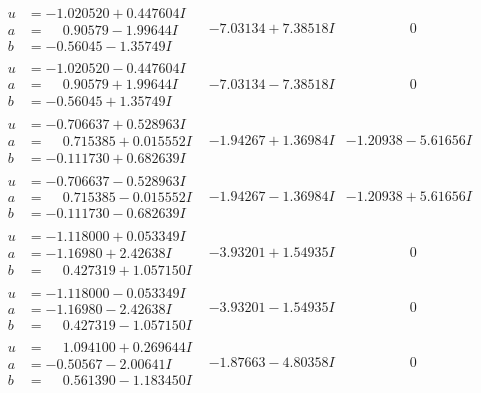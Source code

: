 \documentclass[1p]{elsarticle_modified}
\theoremstyle{definition}
\begin{document}
$$\begin{array}{c|c|c}
\begin{aligned}
u &= -1.020520 + 0.447604 I \\
a &= \phantom{-}0.90579 - 1.99644 I \\
b &= -0.56045 - 1.35749 I\end{aligned}
 & -7.03134 + 7.38518 I & \phantom{-0.000000 } 0 \\ \hline\begin{aligned}
u &= -1.020520 - 0.447604 I \\
a &= \phantom{-}0.90579 + 1.99644 I \\
b &= -0.56045 + 1.35749 I\end{aligned}
 & -7.03134 - 7.38518 I & \phantom{-0.000000 } 0 \\ \hline\begin{aligned}
u &= -0.706637 + 0.528963 I \\
a &= \phantom{-}0.715385 + 0.015552 I \\
b &= -0.111730 + 0.682639 I\end{aligned}
 & -1.94267 + 1.36984 I & -1.20938 - 5.61656 I \\ \hline\begin{aligned}
u &= -0.706637 - 0.528963 I \\
a &= \phantom{-}0.715385 - 0.015552 I \\
b &= -0.111730 - 0.682639 I\end{aligned}
 & -1.94267 - 1.36984 I & -1.20938 + 5.61656 I \\ \hline\begin{aligned}
u &= -1.118000 + 0.053349 I \\
a &= -1.16980 + 2.42638 I \\
b &= \phantom{-}0.427319 + 1.057150 I\end{aligned}
 & -3.93201 + 1.54935 I & \phantom{-0.000000 } 0 \\ \hline\begin{aligned}
u &= -1.118000 - 0.053349 I \\
a &= -1.16980 - 2.42638 I \\
b &= \phantom{-}0.427319 - 1.057150 I\end{aligned}
 & -3.93201 - 1.54935 I & \phantom{-0.000000 } 0 \\ \hline\begin{aligned}
u &= \phantom{-}1.094100 + 0.269644 I \\
a &= -0.50567 - 2.00641 I \\
b &= \phantom{-}0.561390 - 1.183450 I\end{aligned}
 & -1.87663 - 4.80358 I & \phantom{-0.000000 } 0 \\ \hline\begin{aligned}

\end{aligned}
\end{array}$$
\end{document}
